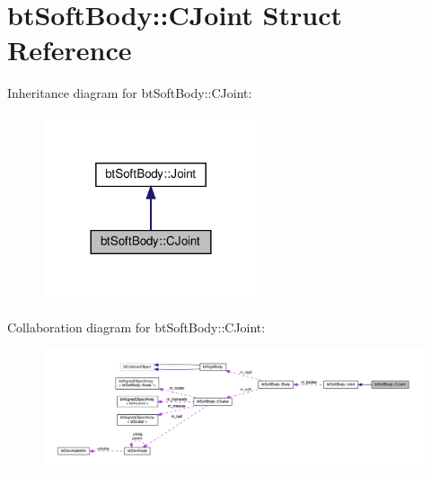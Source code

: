\hypertarget{structbtSoftBody_1_1CJoint}{}\section{bt\+Soft\+Body\+:\+:C\+Joint Struct Reference}
\label{structbtSoftBody_1_1CJoint}


Inheritance diagram for bt\+Soft\+Body\+:\+:C\+Joint\+:
\nopagebreak
\begin{figure}[H]
\begin{center}
\leavevmode
\includegraphics[width=180pt]{structbtSoftBody_1_1CJoint__inherit__graph}
\end{center}
\end{figure}


Collaboration diagram for bt\+Soft\+Body\+:\+:C\+Joint\+:
\nopagebreak
\begin{figure}[H]
\begin{center}
\leavevmode
\includegraphics[width=350pt]{structbtSoftBody_1_1CJoint__coll__graph}
\end{center}
\end{figure}
